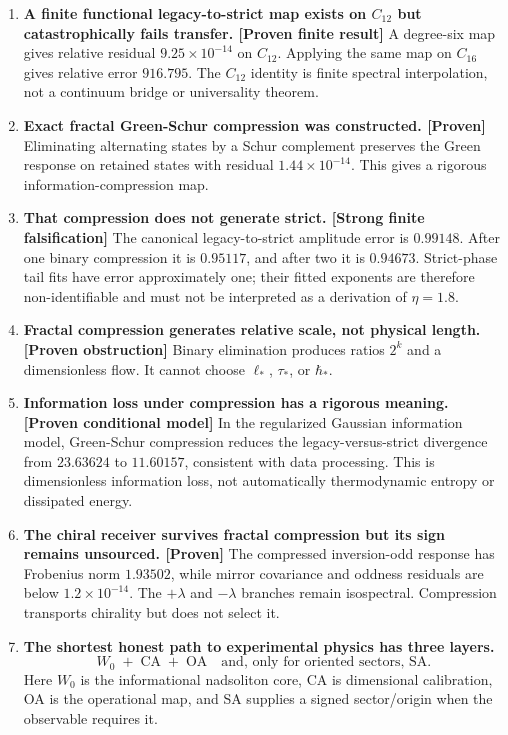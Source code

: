 \documentclass[11pt,a4paper,openany]{report}
\newcommand{\statusProven}{\textcolor{fingreen}{[Proven]}}
\begin{document}
\begin{enumerate}
\item 
\textbf{A finite functional legacy-to-strict map exists on \(C_{12}\) but catastrophically fails transfer. [Proven finite result]} A degree-six map gives relative residual \(9.25\times10^{-14}\) on \(C_{12}\). Applying the same map on \(C_{16}\) gives relative error \(916.795\). The \(C_{12}\) identity is finite spectral interpolation, not a continuum bridge or universality theorem.

\item 
\textbf{Exact fractal Green-Schur compression was constructed. \statusProven{}} Eliminating alternating states by a Schur complement preserves the Green response on retained states with residual \(1.44\times10^{-14}\). This gives a rigorous information-compression map.

\item 
\textbf{That compression does not generate strict. [Strong finite falsification]} The canonical legacy-to-strict amplitude error is \(0.99148\). After one binary compression it is \(0.95117\), and after two it is \(0.94673\). Strict-phase tail fits have error approximately one; their fitted exponents are therefore non-identifiable and must not be interpreted as a derivation of \(\eta=1.8\).

\item 
\textbf{Fractal compression generates relative scale, not physical length. [Proven obstruction]} Binary elimination produces ratios \(2^k\) and a dimensionless flow. It cannot choose \(\ell_*\), \(\tau_*\), or \(\hbar_*\).

\item 
\textbf{Information loss under compression has a rigorous meaning. [Proven conditional model]} In the regularized Gaussian information model, Green-Schur compression reduces the legacy-versus-strict divergence from \(23.63624\) to \(11.60157\), consistent with data processing. This is dimensionless information loss, not automatically thermodynamic entropy or dissipated energy.

\item 
\textbf{The chiral receiver survives fractal compression but its sign remains unsourced. \statusProven{}} The compressed inversion-odd response has Frobenius norm \(1.93502\), while mirror covariance and oddness residuals are below \(1.2\times10^{-14}\). The \(+\lambda\) and \(-\lambda\) branches remain isospectral. Compression transports chirality but does not select it.

\item 
\textbf{The shortest honest path to experimental physics has three layers.} \[
    \boxed{
    W_0\;+\;\mathrm{CA}\;+\;\mathrm{OA}
    \quad
    \text{and, only for oriented sectors, }\mathrm{SA}.
    }
    \] Here \(W_0\) is the informational nadsoliton core, CA is dimensional calibration, OA is the operational map, and SA supplies a signed sector/\allowbreak{}origin when the observable requires it.

\end{enumerate}
\end{document}
